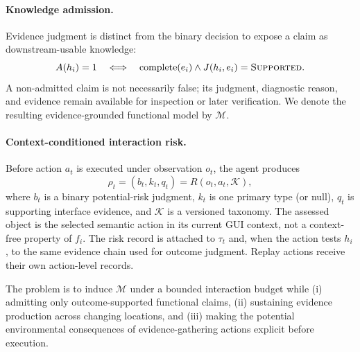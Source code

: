 \paragraph{Knowledge admission.}
Evidence judgment is distinct from the binary decision to expose a claim as
downstream-usable knowledge:
\begin{equation}
    A(h_i)=1
    \quad\Longleftrightarrow\quad
    \operatorname{complete}(e_i)\land
    J(h_i,e_i)=\textsc{Supported}.
    \label{eq:admission}
\end{equation}
A non-admitted claim is not necessarily false; its judgment, diagnostic reason,
and evidence remain available for inspection or later verification. We denote
the resulting evidence-grounded functional model by $\mathcal{M}$.

\paragraph{Context-conditioned interaction risk.}
Before action $a_t$ is executed under observation $o_t$, the agent produces
\begin{equation}
    \rho_t=(b_t,k_t,q_t)=R(o_t,a_t,\mathcal{K}),
\end{equation}
where $b_t$ is a binary potential-risk judgment, $k_t$ is one primary type (or
null), $q_t$ is supporting interface evidence, and $\mathcal{K}$ is a versioned
taxonomy. The assessed object is the selected semantic action in its current
GUI context, not a context-free property of $f_i$. The risk record is attached
to $\tau_t$ and, when the action tests $h_i$, to the same evidence chain used
for outcome judgment. Replay actions receive their own action-level records.

The problem is to induce $\mathcal{M}$ under a bounded interaction budget while
(i) admitting only outcome-supported functional claims, (ii) sustaining
evidence production across changing locations, and (iii) making the potential
environmental consequences of evidence-gathering actions explicit before
execution.
